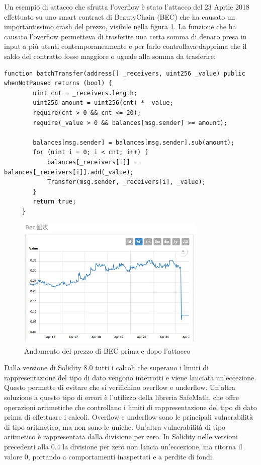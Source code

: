 \documentclass[../../Thesis.tex]{subfiles}
\begin{document}
Un esempio di attacco che sfrutta l'overflow \`e stato l'attacco del 23 Aprile 2018 effettuato su uno smart contract di BeautyChain (BEC) che ha causato un importantissimo crash del prezzo, visibile nella figura \ref{fig:BECPrice}. La funzione che ha causato l'overflow permetteva di trasferire una certa somma di denaro presa in input a pi\`u utenti contemporaneamente e per farlo controllava dapprima che il saldo del contratto fosse maggiore o uguale alla somma da trasferire:
\begin{lstlisting}[language=Solidity]
    function batchTransfer(address[] _receivers, uint256 _value) public whenNotPaused returns (bool) {
        uint cnt = _receivers.length;
        uint256 amount = uint256(cnt) * _value;
        require(cnt > 0 && cnt <= 20);
        require(_value > 0 && balances[msg.sender] >= amount);
    
        balances[msg.sender] = balances[msg.sender].sub(amount);
        for (uint i = 0; i < cnt; i++) {
            balances[_receivers[i]] = balances[_receivers[i]].add(_value);
            Transfer(msg.sender, _receivers[i], _value);
        }
        return true;
     }
\end{lstlisting}

\begin{figure}[h]
    \centering
    \includegraphics[width=0.8\textwidth]{../../img/BECPrice.png}
    \caption{Andamento del prezzo di BEC prima e dopo  l'attacco}
    \label{fig:BECPrice}
\end{figure}
Dalla versione di Solidity 8.0  tutti i calcoli che superano i limiti di rappresentazione del tipo di dato vengono interrotti e viene lanciata un'eccezione. Questo permette di evitare che si verifichino overflow e underflow. Un'altra soluzione a questo tipo di errori \`e l'utilizzo della libreria SafeMath, che offre operazioni aritmetiche che controllano i limiti di rappresentazione del tipo di dato prima di effettuare i calcoli. Overflow e underflow sono le principali vulnerabilit\`a di tipo aritmetico, ma non sono le uniche. Un'altra vulnerabilit\`a di tipo aritmetico \`e rappresentata dalla divisione per zero. In Solidity nelle versioni precedenti alla 0.4 la divisione per zero non lancia un'eccezione, ma ritorna il valore 0, portando a comportamenti inaspettati e a perdite di fondi.
\\
\\
\\
\end{document}
